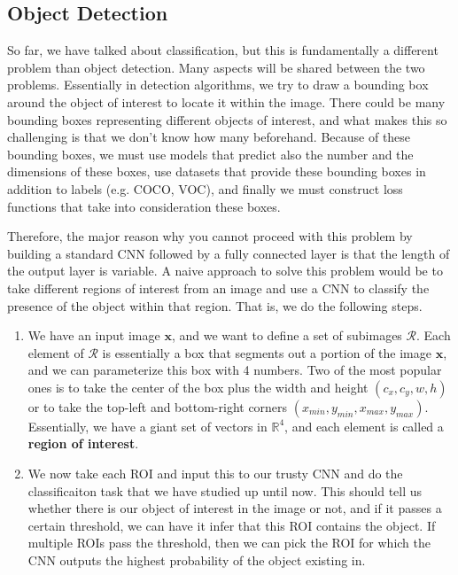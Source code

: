 \documentclass{article}
\theoremstyle{definition}
\theoremstyle{remark}
\theoremstyle{definition}
\begin{document}
\subsection{Object Detection} 

So far, we have talked about classification, but this is fundamentally a different problem than object detection. Many aspects will be shared between the two problems. Essentially in detection algorithms, we try to draw a bounding box around the object of interest to locate it within the image. There could be many bounding boxes representing different objects of interest, and what makes this so challenging is that we don't know how many beforehand. Because of these bounding boxes, we must use models that predict also the number and the dimensions of these boxes, use datasets that provide these bounding boxes in addition to labels (e.g. COCO, VOC), and finally we must construct loss functions that take into consideration these boxes. 

Therefore, the major reason why you cannot proceed with this problem by building a standard CNN followed by a fully connected layer is that the length of the output layer is variable. A naive approach to solve this problem would be to take different regions of interest from an image and use a CNN to classify the presence of the object within that region. That is, we do the following steps. 
\begin{enumerate}
    \item We have an input image $\mathbf{x}$, and we want to define a set of subimages $\mathcal{R}$. Each element of $\mathcal{R}$ is essentially a box that segments out a portion of the image $\mathbf{x}$, and we can parameterize this box with 4 numbers. Two of the most popular ones is to take the center of the box plus the width and height $(c_x, c_y, w, h)$ or to take the top-left and bottom-right corners $(x_{min}, y_{min}, x_{max}, y_{max})$. Essentially, we have a giant set of vectors in $\mathbb{R}^4$, and each element is called a \textbf{region of interest}. 
    \item We now take each ROI and input this to our trusty CNN and do the classificaiton task that we have studied up until now. This should tell us whether there is our object of interest in the image or not, and if it passes a certain threshold, we can have it infer that this ROI contains the object. If multiple ROIs pass the threshold, then we can pick the ROI for which the CNN outputs the highest probability of the object existing in.  
\end{enumerate}
\end{document}
